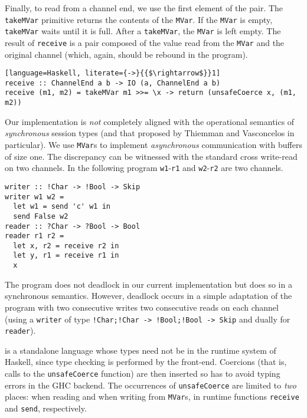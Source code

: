 Finally, to read from a channel end, we use the first element of the
pair. The \lstinline|takeMVar| primitive returns the contents of the
\lstinline|MVar|. If the \lstinline|MVar| is empty,
\lstinline|takeMVar| waits until it is full. After a
\lstinline|takeMVar|, the \lstinline|MVar| is left empty. The result
of \lstinline|receive| is a pair composed of the value read from the
\lstinline|MVar| and the original channel (which, again, should be
rebound in the program).
%
\begin{lstlisting}[language=Haskell, literate={->}{{$\rightarrow$}}1]
receive :: ChannelEnd a b -> IO (a, ChannelEnd a b)
receive (m1, m2) = takeMVar m1 >>= \x -> return (unsafeCoerce x, (m1, m2))
\end{lstlisting}

Our implementation is \emph{not} completely aligned with the
operational semantics of \emph{synchronous} session types (and that
proposed by Thiemman and Vasconcelos in particular). We use
\lstinline|MVar|s to implement \emph{asynchronous} communication with
buffers of size one. The discrepancy can be witnessed with the standard
cross write-read on two channels. In the following program
\lstinline|w1|-\lstinline|r1| and \lstinline|w2|-\lstinline|r2| are
two channels.
%
\begin{lstlisting}
writer :: !Char -> !Bool -> Skip
writer w1 w2 =
  let w1 = send 'c' w1 in
  send False w2
reader :: ?Char -> ?Bool -> Bool
reader r1 r2 =
  let x, r2 = receive r2 in
  let y, r1 = receive r1 in
  x
\end{lstlisting}
%
The program does not deadlock in our current implementation but does
so in a synchronous semantics. However, deadlock occurs in a simple
adaptation of the program with two consecutive writes two consecutive
reads on each channel (using a \lstinline|writer| of type
\lstinline|!Char;!Char -> !Bool;!Bool -> Skip| and dually for
\lstinline|reader|).


\freest{} is a standalone language whose types need not be in the
runtime system of Haskell, since type checking is performed by the
\freest{} front-end.
%
Coercions (that is, calls to the \lstinline|unsafeCoerce| function)
are then inserted so has to avoid typing errors in the GHC
backend. The occurrences of \lstinline|unsafeCoerce| are limited to
\emph{two} places: when reading and when writing from
\lstinline|MVar|s, in runtime functions \lstinline|receive| and
\lstinline|send|, respectively.

